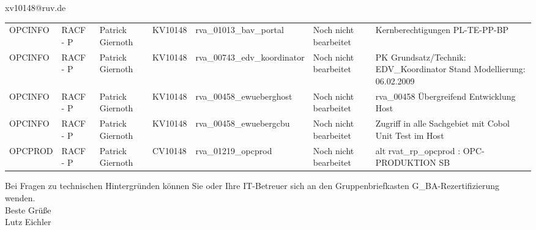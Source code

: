 \documentclass[a4paper,landscape,12pt]{letter}
\begin{document}
\begin{letter}{xv10148@ruv.de\hfill \break}
\begin{tiny}
\begin{longtable}{|p{35mm}|p{15mm}|p{25mm}|p{10mm}|p{40mm}|p{50mm}|p{50mm}|}
OPCINFO & RACF - P & Patrick Giernoth & KV10148 & rva\_01013\_bav\_portal & Noch nicht bearbeitet & Kernberechtigungen PL-TE-PP-BP \\
OPCINFO & RACF - P & Patrick Giernoth & KV10148 & rva\_00743\_edv\_koordinator & Noch nicht bearbeitet & PK Grundsatz/Technik: EDV\_Koordinator Stand Modellierung: 06.02.2009 \\
OPCINFO & RACF - P & Patrick Giernoth & KV10148 & rva\_00458\_ewueberghost & Noch nicht bearbeitet & rva\_00458 Übergreifend Entwicklung Host \\
OPCINFO & RACF - P & Patrick Giernoth & KV10148 & rva\_00458\_ewuebergcbu & Noch nicht bearbeitet & Zugriff in alle Sachgebiet mit Cobol Unit Test im Host \\
OPCPROD & RACF - P & Patrick Giernoth & CV10148 & rva\_01219\_opcprod & Noch nicht bearbeitet & alt rvat\_rp\_opcprod          : OPC-PRODUKTION                           SB \\

\hline
		\end{longtable}
		\end{tiny}
	
\begin{minipage}{\textwidth}
			Bei Fragen zu technischen Hintergründen können Sie 
			oder Ihre IT-Betreuer sich an den Gruppenbriefkasten 
			G\_BA-Rezertifizierung
			wenden.\\
			\linebreak
			Beste Grüße\\
			Lutz Eichler
	\end{minipage}
	\end{letter}
	
\end{document}
